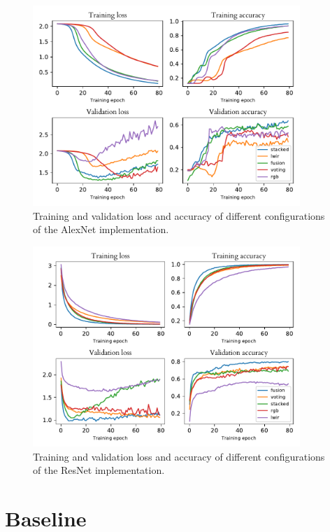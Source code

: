 \documentclass{l4proj}
\begin{document}
\begin{appendices}
\begin{figure}[ht]
  \centering
  \includegraphics[width=0.9\textwidth]{images/evaluation/gridsearch/AlexNet}
  \caption{Training and validation loss and accuracy of different configurations of the AlexNet implementation.}
  \label{fig:alexnet_configs}
\end{figure}

\begin{figure}[ht]
  \centering
  \includegraphics[width=0.9\textwidth]{images/evaluation/gridsearch/ResNet}
  \caption{Training and validation loss and accuracy of different configurations of the ResNet implementation.}
  \label{fig:resnet_configs_app}
\end{figure}

\chapter{Baseline}
\label{appendix_baseline}


\end{appendices}
\end{document}
